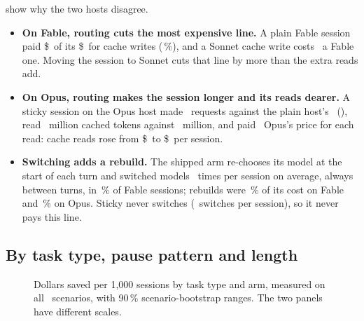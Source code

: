  show why the two hosts disagree.
\begin{itemize}
  \item \textbf{On Fable, routing cuts the most expensive line.} A plain Fable session paid \$\CompFableAnchorWrite\
    of its \$\CompFableAnchorTotal\ for cache writes (\WriteShareFableAnchor\,\%), and a Sonnet cache write costs
    \SonnetFableWritePriceX\X\ a Fable one. Moving the session to Sonnet cuts that line by more than the extra reads
    add.
  \item \textbf{On Opus, routing makes the session longer and its reads dearer.} A sticky session on the Opus
    host made \CompOpusStickyReq\ requests against the plain host's \CompOpusAnchorReq\
    (\ReqRatioOpusSticky\X), read \CompOpusStickyReadTok\ million cached tokens against
    \CompOpusAnchorReadTok\ million, and paid \SonnetOpusReadPriceX\X\ Opus's price for each read: cache
    reads rose from \$\CompOpusAnchorRead\ to \$\CompOpusStickyRead\ per session.
  \item \textbf{Switching adds a rebuild.} The shipped arm re-chooses its model at the start of each turn and
    switched models \SwitchFable\ times per session on average, always between turns, in \SwitchShareFable\,\% of Fable sessions; rebuilds were \RebuildFable\,\% of its cost on
    Fable and \RebuildOpus\,\% on Opus. Sticky never switches (\SwitchStickyFable\ switches per session),
    so it never pays this line.
\end{itemize}

\subsection{By task type, pause pattern and length}\label{sec:slices}

\begin{figure}[htbp]
\centering
{}\par\smallskip

\par\medskip
{}
\caption{Dollars saved per 1,000 sessions by task type and arm, measured on all \NScenarios\ scenarios, with
90\,\% scenario-bootstrap ranges. The two panels have different scales.}
\label{fig:savings}
\end{figure}

